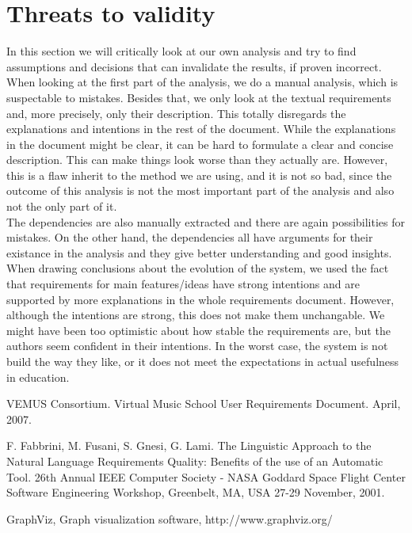 \documentclass[a4paper,11pt]{article}
\begin{document}
	\section{Threats to validity}
		In this section we will critically look at our own analysis and try to find assumptions and decisions that can invalidate the results, if proven incorrect. \\
		When looking at the first part of the analysis, we do a manual analysis, which is suspectable to mistakes. Besides that, we only look at the textual requirements and, more precisely, only their description. This totally disregards the explanations and intentions in the rest of the document. While the explanations in the document might be clear, it can be hard to formulate a clear and concise description. This can make things look worse than they actually are. However, this is a flaw inherit to the method we are using, and it is not so bad, since the outcome of this analysis is not the most important part of the analysis and also not the only part of it. \\
		The dependencies are also manually extracted and there are again possibilities for mistakes. On the other hand, the dependencies all have arguments for their existance in the analysis and they give better understanding and good insights. \\
		When drawing conclusions about the evolution of the system, we used the fact that requirements for main features/ideas have strong intentions and are supported by more explanations in the whole requirements document. However, although the intentions are strong, this does not make them unchangable. We might have been too optimistic about how stable the requirements are, but the authors seem confident in their intentions. In the worst case, the system is not build the way they like, or it does not meet the expectations in actual usefulness in education. 

	\begin{thebibliography}{9}
			VEMUS Consortium.
			Virtual Music School User Requirements Document.
			April, 2007.

			F. Fabbrini, M. Fusani, S. Gnesi, G. Lami. 
			The Linguistic Approach to the Natural Language Requirements Quality: Benefits of the use of an Automatic Tool.
			26th Annual IEEE Computer Society - NASA Goddard Space Flight Center Software Engineering Workshop,
			Greenbelt, MA, USA 27-29 November, 2001.

			GraphViz, Graph visualization software, http://www.graphviz.org/

	\end{thebibliography}
\end{document}
